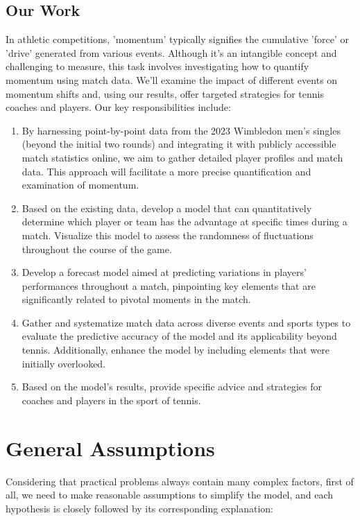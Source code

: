 \documentclass[12pt]{article}  %
\begin{document}
\subsection{Our Work}
In athletic competitions, 'momentum' typically signifies the cumulative 'force' or 'drive' generated from various events. 
Although it's an intangible concept and challenging to measure, this task involves investigating how to quantify momentum using match data. 
We'll examine the impact of different events on momentum shifts and, using our results, 
offer targeted strategies for tennis coaches and players. Our key responsibilities include:
\begin{enumerate}[\bfseries 1.]
    \setlength{\parsep}{0ex} %
    \setlength{\topsep}{0.5pt} %
    \setlength{\itemsep}{0.5pt} %
    \item By harnessing point-by-point data from the 2023 Wimbledon men's singles (beyond the initial two rounds) and integrating it 
    with publicly accessible match statistics online, we aim to gather detailed player profiles and match data. 
    This approach will facilitate a more precise quantification and examination of momentum.
    \item Based on the existing data, develop a model that can quantitatively determine which player or team has the advantage at specific times 
    during a match. Visualize this model to assess the randomness of fluctuations throughout the course of the game.
    \item Develop a forecast model aimed at predicting variations in players' performances throughout a match, 
    pinpointing key elements that are significantly related to pivotal moments in the match.
    \item Gather and systematize match data across diverse events and sports types to evaluate 
    the predictive accuracy of the model and its applicability beyond tennis. Additionally, 
    enhance the model by including elements that were initially overlooked.
    \item Based on the model's results, provide specific advice and strategies for coaches and players in the sport of tennis.
\end{enumerate}

\section{General Assumptions}
Considering that practical problems always contain many complex factors, first of all, we need to make reasonable assumptions to simplify the model, and each hypothesis is closely followed by its corresponding explanation:
\end{document}
